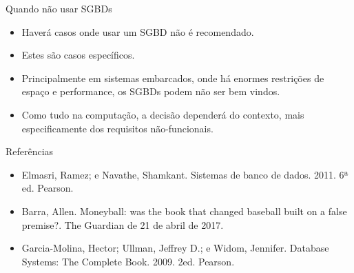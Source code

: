 \documentclass[11pt]{beamer}
\begin{document}
\begin{frame}{Quando não usar SGBDs}
    \begin{itemize}
        \item Haverá casos onde usar um SGBD não é recomendado.
        \item Estes são casos específicos.
        \item Principalmente em sistemas embarcados, onde há enormes restrições de espaço e performance, os SGBDs podem não ser bem vindos.
        \item Como tudo na computação, a decisão dependerá do contexto, mais especificamente dos requisitos não-funcionais.
    \end{itemize}
\end{frame}

\begin{frame}{Referências}
    \begin{itemize}
        \item Elmasri, Ramez; e Navathe, Shamkant. Sistemas de banco de dados. 2011. 6ª ed. Pearson.
        \item Barra, Allen. Moneyball: was the book that changed baseball built on a false premise?. The Guardian de 21 de abril de 2017.
        \item Garcia-Molina, Hector; Ullman, Jeffrey D.; e Widom, Jennifer. Database Systems: The Complete Book. 2009. 2ed. Pearson.
    \end{itemize}
\end{frame}
\end{document}
